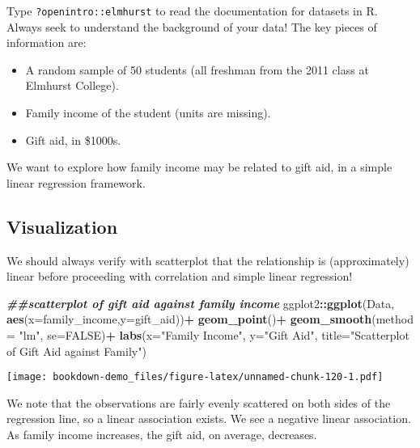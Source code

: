 \documentclass[
]{book}
\newenvironment{Shaded}{\begin{snugshade}}{\end{snugshade}}
\newcommand{\AttributeTok}[1]{\textcolor[rgb]{0.13,0.29,0.53}{#1}}
\newcommand{\ConstantTok}[1]{\textcolor[rgb]{0.56,0.35,0.01}{#1}}
\newcommand{\DocumentationTok}[1]{\textcolor[rgb]{0.56,0.35,0.01}{\textbf{\textit{#1}}}}
\newcommand{\FunctionTok}[1]{\textcolor[rgb]{0.13,0.29,0.53}{\textbf{#1}}}
\newcommand{\NormalTok}[1]{#1}
\newcommand{\SpecialCharTok}[1]{\textcolor[rgb]{0.81,0.36,0.00}{\textbf{#1}}}
\newcommand{\StringTok}[1]{\textcolor[rgb]{0.31,0.60,0.02}{#1}}
\providecommand{\tightlist}{%
  \setlength{\itemsep}{0pt}\setlength{\parskip}{0pt}}
\begin{document}
Type \texttt{?openintro::elmhurst} to read the documentation for datasets in R. Always seek to understand the background of your data! The key pieces of information are:

\begin{itemize}
\tightlist
\item
  A random sample of 50 students (all freshman from the 2011 class at Elmhurst College).
\item
  Family income of the student (units are missing).
\item
  Gift aid, in \$1000s.
\end{itemize}

We want to explore how family income may be related to gift aid, in a simple linear regression framework.

\hypertarget{visualization}{%
\subsection*{Visualization}\label{visualization}}

We should always verify with scatterplot that the relationship is (approximately) linear before proceeding with correlation and simple linear regression!

\begin{Shaded}
\begin{Highlighting}[]
\DocumentationTok{\#\#scatterplot of gift aid against family income}
\NormalTok{ggplot2}\SpecialCharTok{::}\FunctionTok{ggplot}\NormalTok{(Data, }\FunctionTok{aes}\NormalTok{(}\AttributeTok{x=}\NormalTok{family\_income,}\AttributeTok{y=}\NormalTok{gift\_aid))}\SpecialCharTok{+}
  \FunctionTok{geom\_point}\NormalTok{()}\SpecialCharTok{+}
  \FunctionTok{geom\_smooth}\NormalTok{(}\AttributeTok{method =} \StringTok{"lm"}\NormalTok{, }\AttributeTok{se=}\ConstantTok{FALSE}\NormalTok{)}\SpecialCharTok{+}
  \FunctionTok{labs}\NormalTok{(}\AttributeTok{x=}\StringTok{"Family Income"}\NormalTok{, }\AttributeTok{y=}\StringTok{"Gift Aid"}\NormalTok{, }\AttributeTok{title=}\StringTok{"Scatterplot of Gift Aid against Family"}\NormalTok{)}
\end{Highlighting}
\end{Shaded}

\texttt{[image: bookdown-demo\_files/figure-latex/unnamed-chunk-120-1.pdf]}

We note that the observations are fairly evenly scattered on both sides of the regression line, so a linear association exists. We see a negative linear association. As family income increases, the gift aid, on average, decreases.
\end{document}
